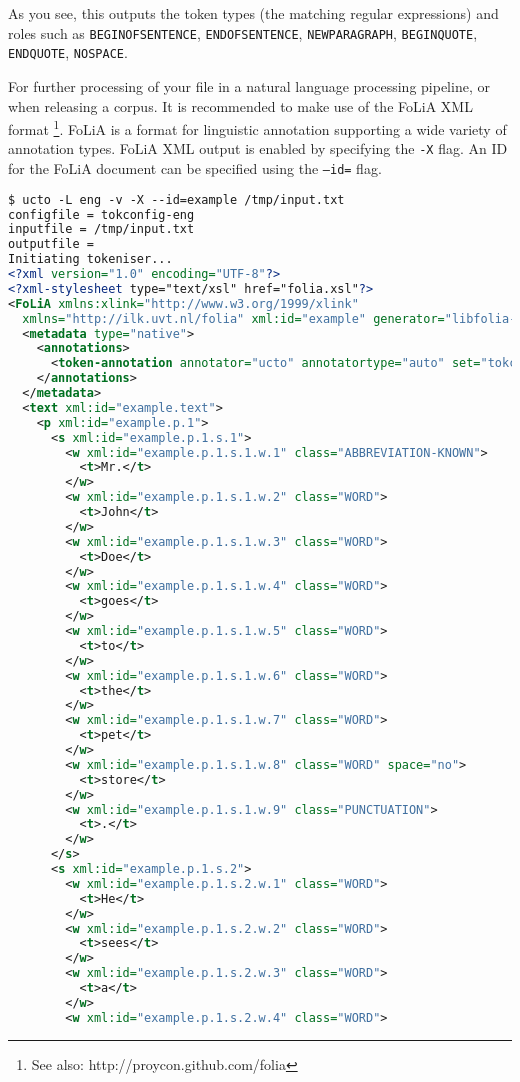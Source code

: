 \documentclass[a4paper,12pt]{report}
\begin{document}
As you see, this outputs the token types (the matching regular expressions) and roles such as \texttt{BEGINOFSENTENCE}, \texttt{ENDOFSENTENCE}, \texttt{NEWPARAGRAPH}, \texttt{BEGINQUOTE}, \texttt{ENDQUOTE}, \texttt{NOSPACE}.

For further processing of your file in a natural language processing pipeline, or when releasing a corpus. It is recommended to make use of the FoLiA XML format \cite{FOLIA} \footnote{See also:  http://proycon.github.com/folia}. FoLiA is a format for linguistic annotation supporting a wide variety of annotation types. FoLiA XML output is enabled by specifying the \texttt{-X} flag. An ID for the FoLiA document can be specified using the \texttt{--id=} flag.

\begin{lstlisting}[language=xml]
$ ucto -L eng -v -X --id=example /tmp/input.txt
configfile = tokconfig-eng
inputfile = /tmp/input.txt
outputfile = 
Initiating tokeniser...
<?xml version="1.0" encoding="UTF-8"?>
<?xml-stylesheet type="text/xsl" href="folia.xsl"?>
<FoLiA xmlns:xlink="http://www.w3.org/1999/xlink" 
  xmlns="http://ilk.uvt.nl/folia" xml:id="example" generator="libfolia-v0.10">
  <metadata type="native">
    <annotations>
      <token-annotation annotator="ucto" annotatortype="auto" set="tokconfig-en"/>
    </annotations>
  </metadata>
  <text xml:id="example.text">
    <p xml:id="example.p.1">
      <s xml:id="example.p.1.s.1">
        <w xml:id="example.p.1.s.1.w.1" class="ABBREVIATION-KNOWN">
          <t>Mr.</t>
        </w>
        <w xml:id="example.p.1.s.1.w.2" class="WORD">
          <t>John</t>
        </w>
        <w xml:id="example.p.1.s.1.w.3" class="WORD">
          <t>Doe</t>
        </w>
        <w xml:id="example.p.1.s.1.w.4" class="WORD">
          <t>goes</t>
        </w>
        <w xml:id="example.p.1.s.1.w.5" class="WORD">
          <t>to</t>
        </w>
        <w xml:id="example.p.1.s.1.w.6" class="WORD">
          <t>the</t>
        </w>
        <w xml:id="example.p.1.s.1.w.7" class="WORD">
          <t>pet</t>
        </w>
        <w xml:id="example.p.1.s.1.w.8" class="WORD" space="no">
          <t>store</t>
        </w>
        <w xml:id="example.p.1.s.1.w.9" class="PUNCTUATION">
          <t>.</t>
        </w>
      </s>
      <s xml:id="example.p.1.s.2">
        <w xml:id="example.p.1.s.2.w.1" class="WORD">
          <t>He</t>
        </w>
        <w xml:id="example.p.1.s.2.w.2" class="WORD">
          <t>sees</t>
        </w>
        <w xml:id="example.p.1.s.2.w.3" class="WORD">
          <t>a</t>
        </w>
        <w xml:id="example.p.1.s.2.w.4" class="WORD">

\end{lstlisting}
\end{document}
